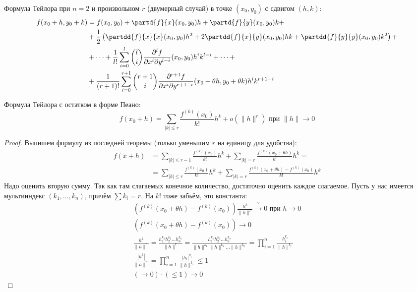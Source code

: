 \begin{Rem}
	Формула Тейлора при $n=2$ и произвольном $r$ (двумерный случай) в точке $(x_0, y_0)$ с сдвигом $(h, k)$:
	\begin{align*}
		f(x_0+h, y_0+k)
			&= f(x_0, y_0)
			+ \partd{f}{x}(x_0, y_0)h + \partd{f}{y}(x_0, y_0)k + \\
			&+ \frac12\left(
				\partdd{f}{x}{x} (x_0, y_0) h^2
				+ 2\partdd{f}{x}{y} (x_0, y_0) hk
				+  \partdd{f}{y}{y} (x_0, y_0) k^2
			\right) + \\
			&+ \dots
			 + \frac{1}{    l!} \sum_{i=0}^l     \binom{l  }{i} \frac{\partial^l     f}{\partial x^i \partial y^{l  -i}} (x_0, y_0)                   h^i k^{l  -i}
			 + \dots + \\
			&+ \frac{1}{(r+1)!} \sum_{i=0}^{r+1} \binom{r+1}{i} \frac{\partial^{r+1} f}{\partial x^i \partial y^{r+1-i}} (x_0+\theta h, y_0+\theta k) h^i k^{r+1-i}
	\end{align*}
\end{Rem}

\begin{theorem}
	Формула Тейлора с остатком в форме Пеано:
	\[ f(x_0+h) = \sum_{|k|\le r} \frac{f^{(k)}(x_0)}{k!} h^k + o(\|h\|^r) \text{~при~} \|h\| \to 0\]
\end{theorem}
\begin{proof}
	Выпишем формулу из последней теоремы (только уменьшим $r$ на единицу для удобства):
	\begin{align*}
		f(x+h) &= \sum_{|k|\le r-1} \frac{f^{(k)}(x_0)}{k!} h^k + \sum_{|k|=r}\frac{f^{(k)}(x_0+\theta h)}{k!}h^k = \\
		       &= \sum_{|k|\le r  } \frac{f^{(k)}(x_0)}{k!} h^k + \sum_{|k|=r}\frac{f^{(k)}(x_0+\theta h)-f^{(k)}(x_0)}{k!}h^k
	\end{align*}
	Надо оценить вторую сумму.
	Так как там слагаемых конечное количество, достаточно оценить каждое слагаемое.
	Пусть у нас имеется мультииндекс $(k_1, \dots, k_n)$, причём $\sum k_i = r$.
	На $k!$ тоже забьём, это константа:
	\begin{gather*}
		\left(f^{(k)}(x_0+\theta h) - f^{(k)} (x_0)\right) \frac{h^k}{\|h\|^r} \stackrel{?}{\to} 0 \text{~при~} h \to 0 \\
		\left(f^{(k)}(x_0+\theta h) - f^{(k)} (x_0)\right) \to 0 \\
		\frac{h^k}{\|h\|^r}
			= \frac{h_1^{k_1}h_2^{k_2}\dots h_n^{k_n}}{\|h\|^r}
			= \frac{h_1^{k_1}h_2^{k_2}\dots h_n^{k_n}}{\|h\|^{k_1}\|h\|^{k_2}\dots\|h\|^{k_n}}
			= \prod_{i=1}^{n} \frac{h_i^{k_i}}{\|h\|^{k_i}} \\
		\frac{|h^k|}{\|h\|^r}
			= \prod_{i=1}^{n} \frac{|h_i|^{k_i}}{\|h\|^{k_i}}
			\le 1 \\
		(\to 0) \cdot (\le 1) \to 0
	\end{gather*}
\end{proof}

